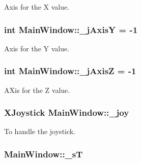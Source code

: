 Axis for the X value. 

\hypertarget{a00004_aaaced09ce813bbcac92047f5ef39f182}{}
\subsubsection[{\+\_\+j\+Axis\+Y}]{\setlength{\rightskip}{0pt plus 5cm}int Main\+Window\+::\+\_\+j\+Axis\+Y = -\/1\hspace{0.3cm}{\ttfamily [private]}}\label{a00004_aaaced09ce813bbcac92047f5ef39f182}


Axis for the Y value. 

\hypertarget{a00004_a18cc17eff4ff04ee0aae07c609e82d33}{}
\subsubsection[{\+\_\+j\+Axis\+Z}]{\setlength{\rightskip}{0pt plus 5cm}int Main\+Window\+::\+\_\+j\+Axis\+Z = -\/1\hspace{0.3cm}{\ttfamily [private]}}\label{a00004_a18cc17eff4ff04ee0aae07c609e82d33}


A\+Xis for the Z value. 

\hypertarget{a00004_a671f35800890e518713e1946671d8730}{}
\subsubsection[{\+\_\+joy}]{\setlength{\rightskip}{0pt plus 5cm}X\+Joystick Main\+Window\+::\+\_\+joy\hspace{0.3cm}{\ttfamily [private]}}\label{a00004_a671f35800890e518713e1946671d8730}


To handle the joystick. 

\hypertarget{a00004_a97f8ecc7ecb930b796178cef7b975013}{}
\subsubsection[{\+\_\+s\+T}]{ Main\+Window\+::\+\_\+s\+T\hspace{0.3cm}{\ttfamily [private]}}\label{a00004_a97f8ecc7ecb930b796178cef7b975013}


